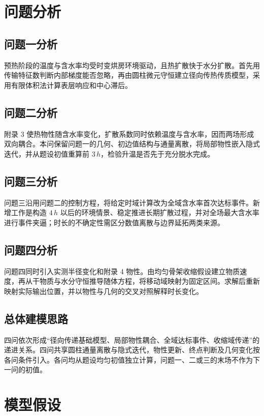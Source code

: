 \documentclass[withoutpreface,bwprint]{cumcmthesis}
\begin{document}
\section{问题分析}

\subsection{问题一分析}

预热阶段的温度与含水率均受时变烘房环境驱动，且热扩散快于水分扩散。首先用传输特征数判断内部梯度能否忽略，再由圆柱微元守恒建立径向传热传质模型，采用有限体积法计算表层响应和中心滞后。

\subsection{问题二分析}

附录 3 使热物性随含水率变化，扩散系数同时依赖温度与含水率，因而两场形成双向耦合。本问保留问题一的几何、初边值结构与通量离散，将局部物性嵌入隐式迭代，并从题设初值重算前 $3\,\si{h}$，检验升温是否先于充分脱水完成。

\subsection{问题三分析}

问题三沿用问题二的控制方程，将给定时域计算改为全域含水率首次达标事件。新增工作是构造 $4\,\si{h}$ 以后的环境情景、稳定推进长期扩散过程，并对全场最大含水率进行事件夹逼；时长的不确定性需区分数值离散与边界延拓两类来源。

\subsection{问题四分析}

问题四同时引入实测半径变化和附录 4 物性。由均匀骨架收缩假设建立物质速度，再从干物质与水分守恒推导随体方程，将移动域映射为固定区间。求解后重新映射实际输出位置，并以物性与几何的交叉对照解释时长变化。

\subsection{总体建模思路}

四问依次形成“径向传递基础模型、局部物性耦合、全域达标事件、收缩域传递”的递进关系。四问共享圆柱通量离散与隐式迭代，物性更新、终点判断及几何变化按各问条件引入。各问均从题设均匀初值独立计算，问题一、二或三的末场不作为下一问的初值。

\section{模型假设}
\end{document}
